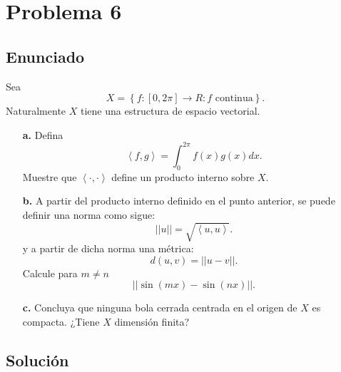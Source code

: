 \documentclass{report}
\begin{document}
\chapter{Problema 6}
\section{Enunciado}

Sea \[
X = \left\{ f:\left[ 0, 2\pi \right] \to R: \text{$f$ continua} \right\} 
.\] Naturalmente $X$ tiene una estructura de espacio vectorial.
\begin{enumerate}
  \item[\textbf{a.}] Defina \[
      \left<f, g \right> = \int_0^{2\pi}f\left( x \right) g\left( x \right) dx	
    .\] Muestre que $\left< \cdot, \cdot\right>$ define un producto interno sobre $X$.
  \item[\textbf{b.}] A partir del producto interno definido en el punto anterior, se puede definir una norma como sigue: \[
      \left| \left| u \right|  \right|  = \sqrt{\left<u, u \right>} 
      .\] y a partir de dicha norma una métrica: \[
      d(u, v) =  \left| \left| u - v \right|  \right| 
      .\] Calcule para $m \neq n$ \[
      \left| \left| \sin\left( mx \right) - \sin\left( nx \right)  \right|  \right| 
    .\] 
  \item[\textbf{c.}] Concluya que ninguna bola cerrada centrada en el origen de $X$ es compacta. ¿Tiene $X$ dimensión finita?
\end{enumerate}
\section{Solución}
\end{document}
